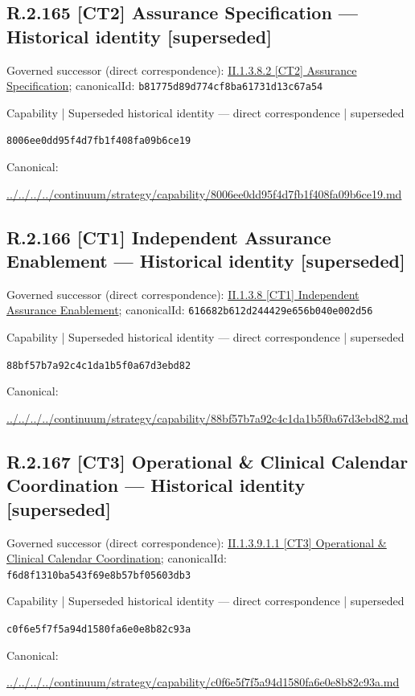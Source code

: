 \documentclass[10pt,a4paper]{article}
\begin{document}
\subsection*{R.2.165 [CT2] Assurance Specification — Historical identity [superseded]}
Governed successor (direct correspondence): \hyperref[element-b81775d89d774cf8ba61731d13c67a54]{II.1.3.8.2 [CT2] Assurance Specification}; canonicalId: \texttt{b81775d89d774cf8ba61731d13c67a54}\par
\label{element-8006ee0dd95f4d7fb1f408fa09b6ce19}
{\small Capability | Superseded historical identity — direct correspondence | superseded}\par
\texttt{8006ee0dd95f4d7fb1f408fa09b6ce19}\par
Canonical: \par
{\footnotesize\url{../../../../continuum/strategy/capability/8006ee0dd95f4d7fb1f408fa09b6ce19.md}}\par
\subsection*{R.2.166 [CT1] Independent Assurance Enablement — Historical identity [superseded]}
Governed successor (direct correspondence): \hyperref[element-616682b612d244429e656b040e002d56]{II.1.3.8 [CT1] Independent Assurance Enablement}; canonicalId: \texttt{616682b612d244429e656b040e002d56}\par
\label{element-88bf57b7a92c4c1da1b5f0a67d3ebd82}
{\small Capability | Superseded historical identity — direct correspondence | superseded}\par
\texttt{88bf57b7a92c4c1da1b5f0a67d3ebd82}\par
Canonical: \par
{\footnotesize\url{../../../../continuum/strategy/capability/88bf57b7a92c4c1da1b5f0a67d3ebd82.md}}\par
\subsection*{R.2.167 [CT3] Operational \& Clinical Calendar Coordination — Historical identity [superseded]}
Governed successor (direct correspondence): \hyperref[element-f6d8f1310ba543f69e8b57bf05603db3]{II.1.3.9.1.1 [CT3] Operational \& Clinical Calendar Coordination}; canonicalId: \texttt{f6d8f1310ba543f69e8b57bf05603db3}\par
\label{element-c0f6e5f7f5a94d1580fa6e0e8b82c93a}
{\small Capability | Superseded historical identity — direct correspondence | superseded}\par
\texttt{c0f6e5f7f5a94d1580fa6e0e8b82c93a}\par
Canonical: \par
{\footnotesize\url{../../../../continuum/strategy/capability/c0f6e5f7f5a94d1580fa6e0e8b82c93a.md}}\par
\end{document}
